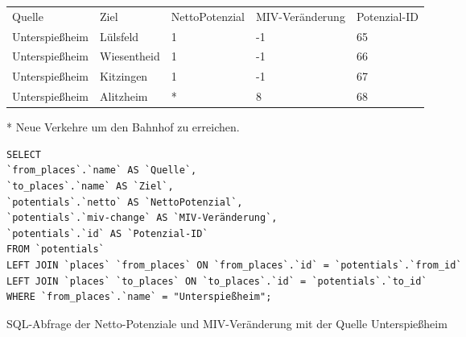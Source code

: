 \begin{tabularx}{\textwidth}{*5{X}}
Quelle & Ziel & NettoPotenzial & MIV-Veränderung & Potenzial-ID\\ 
Unterspießheim & Lülsfeld & 1 & -1 & 65\\ 
Unterspießheim & Wiesentheid & 1 & -1 & 66\\ 
Unterspießheim & Kitzingen & 1 & -1 & 67\\ 
Unterspießheim & Alitzheim & * & 8 & 68\\ 
\end{tabularx}    
\newline
\newline
* Neue Verkehre um den Bahnhof zu erreichen.
\newline
\begin{listing}[htbp]
\begin{verbatim}
SELECT
`from_places`.`name` AS `Quelle`, 
`to_places`.`name` AS `Ziel`, 
`potentials`.`netto` AS `NettoPotenzial`, 
`potentials`.`miv-change` AS `MIV-Veränderung`, 
`potentials`.`id` AS `Potenzial-ID`
FROM `potentials`
LEFT JOIN `places` `from_places` ON `from_places`.`id` = `potentials`.`from_id`
LEFT JOIN `places` `to_places` ON `to_places`.`id` = `potentials`.`to_id`
WHERE `from_places`.`name` = "Unterspießheim";
\end{verbatim}
\caption{SQL-Abfrage der Netto-Potenziale und MIV-Veränderung mit der Quelle Unterspießheim}\label{lst-fz-unterspiessheim}
\end{listing}